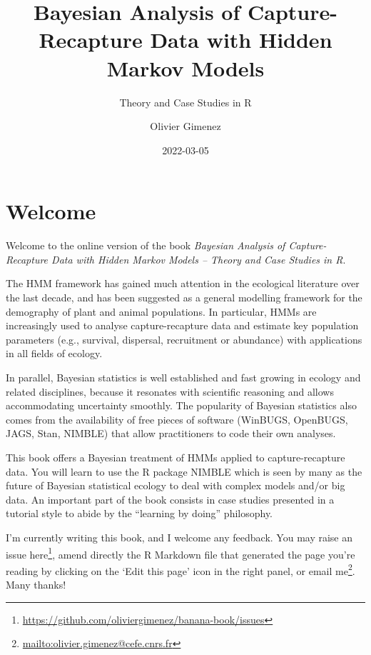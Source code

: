 \documentclass[
  12pt,
]{krantz}
\title{Bayesian Analysis of Capture-Recapture Data with Hidden Markov Models}
\subtitle{Theory and Case Studies in R}
\author{Olivier Gimenez}
\date{2022-03-05}
\renewcommand{\href}[2]{#2\footnote{\url{#1}}}
\begin{document}
\maketitle

\thispagestyle{empty}

\setlength{\abovedisplayskip}{-5pt}
\setlength{\abovedisplayshortskip}{-5pt}

{
\hypersetup{linkcolor=}
\setcounter{tocdepth}{2}
\tableofcontents
}
\listoftables
\listoffigures
\hypertarget{welcome}{%
\chapter*{Welcome}\label{welcome}}


Welcome to the online version of the book \emph{Bayesian Analysis of Capture-Recapture Data with Hidden Markov Models -- Theory and Case Studies in R}.

The HMM framework has gained much attention in the ecological literature over the last decade, and has been suggested as a general modelling framework for the demography of plant and animal populations. In particular, HMMs are increasingly used to analyse capture-recapture data and estimate key population parameters (e.g., survival, dispersal, recruitment or abundance) with applications in all fields of ecology.

In parallel, Bayesian statistics is well established and fast growing in ecology and related disciplines, because it resonates with scientific reasoning and allows accommodating uncertainty smoothly. The popularity of Bayesian statistics also comes from the availability of free pieces of software (WinBUGS, OpenBUGS, JAGS, Stan, NIMBLE) that allow practitioners to code their own analyses.

This book offers a Bayesian treatment of HMMs applied to capture-recapture data. You will learn to use the R package NIMBLE which is seen by many as the future of Bayesian statistical ecology to deal with complex models and/or big data. An important part of the book consists in case studies presented in a tutorial style to abide by the ``learning by doing'' philosophy.

I'm currently writing this book, and I welcome any feedback. You may raise an issue \href{https://github.com/oliviergimenez/banana-book/issues}{here}, amend directly the R Markdown file that generated the page you're reading by clicking on the `Edit this page' icon in the right panel, or \href{mailto:olivier.gimenez@cefe.cnrs.fr}{email me}. Many thanks!
\end{document}

